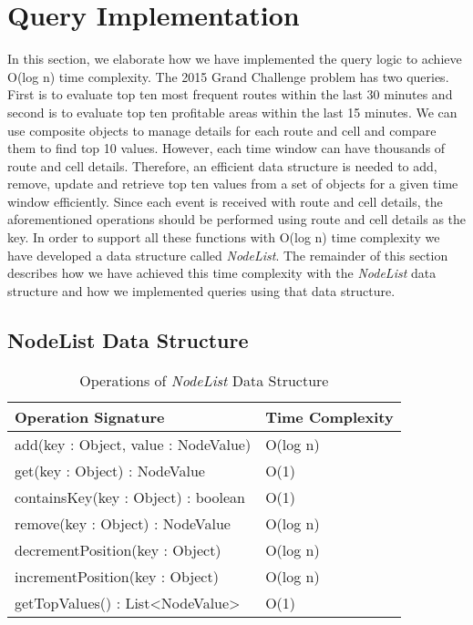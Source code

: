 \section{Query Implementation}
In this section, we elaborate how we have implemented the query logic to achieve O(log n) time complexity. The 2015 Grand Challenge problem has two queries. First is to evaluate top ten most frequent routes within the last 30 minutes and second is to evaluate top ten profitable areas within the last 15 minutes. We can use composite objects to manage details for each route and cell and compare them to find top 10 values. However, each time window can have thousands of route and cell details. Therefore, an efficient data structure is needed to add, remove, update and retrieve top ten values from a set of objects for a given time window efficiently. Since each event is received with route and cell details, the aforementioned operations should be performed using route and cell details as the key. In order to support all these functions with O(log n) time complexity we have developed a data structure called \textit{NodeList}. The remainder of this section describes how we have achieved this time complexity with the \textit{NodeList} data structure and how we implemented queries using that data structure.

\subsection{NodeList Data Structure}

\begin{table}
\centering
\caption{Operations of \textit{NodeList} Data Structure}
\begin{tabular}{|l|l|} \hline
Operation Signature & Time Complexity \\ \hline \hline
add(key : Object, value : NodeValue) & O(log n) \\ \hline 
get(key : Object) : NodeValue & O(1) \\ \hline
containsKey(key : Object) : boolean & O(1) \\ \hline
remove(key : Object) : NodeValue & O(log n) \\ \hline
decrementPosition(key : Object) & O(log n) \\ \hline
incrementPosition(key : Object) & O(log n) \\ \hline
getTopValues() : List<NodeValue> & O(1) \\ \hline
\end{tabular}
\label{nodelist_api}
\end{table}

